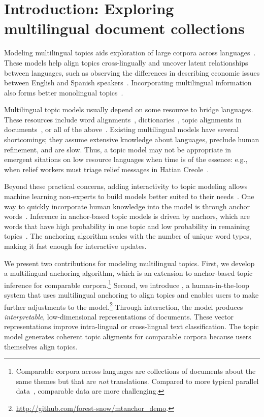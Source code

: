 \section{Introduction: Exploring multilingual document collections}
\label{sec:intro}


Modeling multilingual topics aids exploration of large corpora across
languages~\citep{mimno-2009}.  These models help align topics
cross-lingually and uncover latent relationships between languages,
such as observing the differences in describing economic issues
between English and Spanish speakers~\citep{gutierrez-2016}.
Incorporating multilingual information also forms better monolingual
topics~\citep{jagarlamudi-2010}.




Multilingual topic models usually depend on some resource to bridge languages.  These resources include word
alignments~\citep{zhao-2006}, dictionaries~\citep{jagarlamudi-2010,
  boyd-graber-2010}, topic alignments in documents~\citep{ni-09}, or
all of the above~\citep{hu-2014-ptlda}.  Existing
multilingual models have several shortcomings; they assume
  extensive knowledge about languages, preclude human
  refinement, and are slow. Thus, a topic model may not be
appropriate in emergent sitations on low resource languages when time
is of the essence: e.g., when relief workers must triage relief
messages in Hatian Creole~\citep{morrow-2011}.


Beyond these practical concerns, adding interactivity to topic
modeling allows machine learning non-experts to build models better
suited to their needs~\citep{choo-2013, hu-2014-itm, lee-2017}.  One way to quickly
incorporate human knowledge into the model is through 
anchor words~\citep{lund-2017}.  Inference in anchor-based topic
models is driven by anchors, which are words that have high
probability in one topic and low probability in remaining
topics~\citep{arora-2012-anchor, arora-2013}.  The anchoring algorithm scales with the number of unique word types, making it fast enough for interactive updates.

We present two contributions for modeling multilingual topics.  First,
we develop a multilingual anchoring algorithm, which is an extension to
anchor-based topic inference for comparable corpora.\footnote{Comparable corpora across
  languages are collections of documents about the same themes but
  that are \emph{not} translations.  Compared to more typical parallel
  data~\citep{mauro-2012,graff-1994}, comparable data are more
  challenging.}  Second, we introduce \mtanchor, a human-in-the-loop
system that uses multilingual anchoring to align topics and enables
users to make further adjustments to the model.\footnote{\url{http://github.com/forest-snow/mtanchor_demo}.} Through interaction, the model produces
\emph{interpretable}, low-dimensional representations of documents.
These vector representations improve intra-lingual or
cross-lingual text classification. The topic model generates
coherent topic aligments for comparable corpora
because users themselves align topics.








